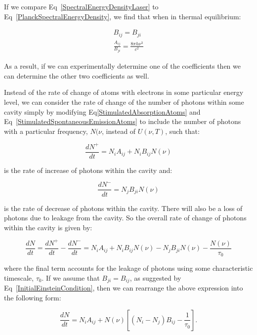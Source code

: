 \noindent If we compare Eq~\ref{SpectralEnergyDensityLaser} to Eq~\ref{PlanckSpectralEnergyDensity}, we find that when in thermal equilibrium:

\begin{eqnarray}
    B_{ij} = B_{ji} \label{InitialEinsteinCondition}\\
    \frac{A_{ij}}{B_{ji}} = \frac{8 \pi h \nu^3}{c^2} \label{FinalEinsteinCondition}
\end{eqnarray}

\noindent As a result, if we can experimentally determine one of the coefficients then we can determine the other two coefficients as well.

\noindent Instead of the rate of change of atoms with electrons in some particular energy level, we can consider the rate of change of the number of photons within some cavity simply by modifying Eq\ref{StimulatedAbsorptionAtoms} and Eq~\ref{StimulatedSpontaneousEmissionAtoms} to include the number of photons with a particular frequency, $N(\nu$, instead of $U(\nu, T)$, such that:

\begin{equation}
    \frac{dN^+}{dt} = N_i A_{ij} + N_i B_{ij} N(\nu)
    \label{StimulatedSpontaneousEmissionPhotons}
\end{equation}

\noindent is the rate of increase of photons within the cavity and:

\begin{equation}
    \frac{dN^-}{dt} = N_j B_{ji} N(\nu)
    \label{StimulatedAbsorptionPhotons}
\end{equation}

\noindent is the rate of decrease of photons within the cavity. There will also be a loss of photons due to leakage from the cavity. So the overall rate of change of photons within the cavity is given by:

\begin{equation}
    \frac{dN}{dt} = \frac{dN^+}{dt} - \frac{dN^-}{dt} = N_i A_{ij} + N_i B_{ij} N(\nu) - N_j B_{ji} N(\nu) - \frac{N(\nu)}{\tau_0}
    \label{OverallRateChangePhotons}
\end{equation}

\noindent where the final term accounts for the leakage of photons using some characteristic timescale, $\tau_0$. If we assume that $B_{ji} = B_{ij}$, as suggested by Eq~\ref{InitialEinsteinCondition}, then we can rearrange the above expression into the following form:

\begin{equation}
    \frac{dN}{dt} = N_i A_{ij} + N(\nu)[(N_i - N_j)B_{ij} - \frac{1}{\tau_0}].
    \label{OverallRateChangePhotonsRearranged}
\end{equation}


